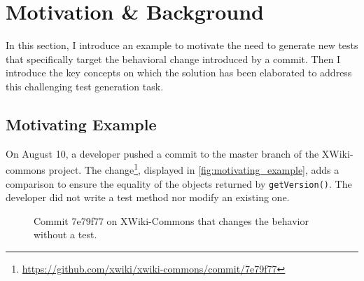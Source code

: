 \section{Motivation \& Background}
\label{sec:dci:background}

In this section, I introduce an example to motivate the need to generate new tests that specifically target the behavioral change introduced by a commit.
Then I introduce the key concepts on which the solution has been elaborated to address this challenging test generation task.

\subsection{Motivating Example}
\label{subsec:dci:background:example}

On August 10, a developer pushed a commit to the master branch of the XWiki-commons project. 
The change\footnote{\url{https://github.com/xwiki/xwiki-commons/commit/7e79f77}}, displayed in \autoref{fig:motivating_example}, adds a comparison to ensure the equality of the objects returned by \texttt{getVersion()}.
The developer did not write a test method nor modify an existing one. 

\begin{figure}[h]
	\centering
	\caption{Commit 7e79f77 on XWiki-Commons that changes the behavior without a test.}
	\label{fig:motivating_example}
\end{figure}

